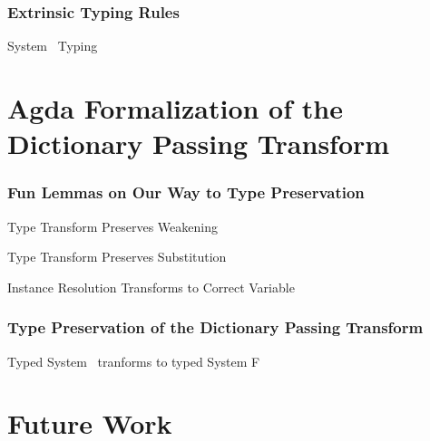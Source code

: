 \documentclass{beamer}
\begin{document}
\begin{frame}[fragile]
  \frametitle{Extrinsic Typing Rules}
  \begin{block}{System \Fo\ Typing}
    \begin{small}
      \FoTyping
    \end{small}
  \end{block}
\end{frame}

\section{Agda Formalization of the Dictionary Passing Transform}
\begin{frame}[fragile]
  \frametitle{Fun Lemmas on Our Way to Type Preservation}
  \begin{block}{Type Transform Preserves Weakening}
    \DPTTypePresRen
  \end{block}
  \begin{block}{Type Transform Preserves Substitution}
    \DPTTypePresSub
  \end{block}
  \begin{block}{Instance Resolution Transforms to Correct Variable}
    \DPTOVarPresLookup
\end{block}
\end{frame}

\begin{frame}[fragile]
  \frametitle{Type Preservation of the Dictionary Passing Transform}
  \begin{block}{Typed System \Fo\ tranforms to typed System F}
    \begin{small}
      \DPTTermPres
    \end{small}
  \end{block}
\end{frame}

\section{Future Work}
\end{document}
